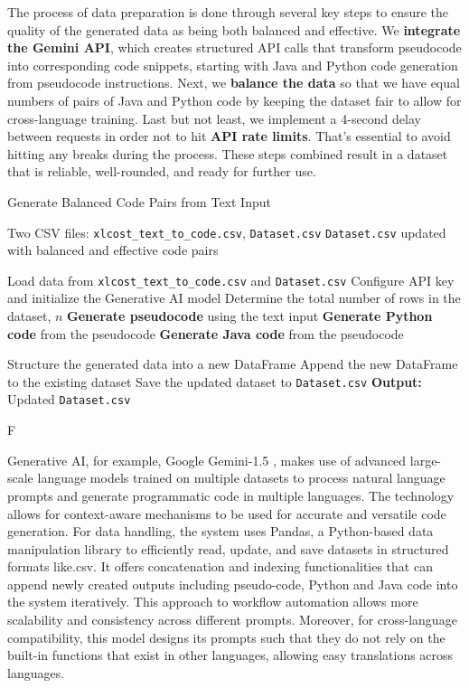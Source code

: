 \documentclass{dhbenelux}
\begin{document}
The process of data preparation is done through several key steps to ensure the quality of the generated data as being both balanced and effective. We \textbf{integrate the Gemini API}, which creates structured API calls that transform pseudocode into corresponding code snippets, starting with Java and Python code generation from pseudocode instructions. Next, we \textbf{balance the data} so that we have equal numbers of pairs of Java and Python code by keeping the dataset fair to allow for cross-language training. Last but not least, we implement a 4-second delay between requests in order not to hit \textbf{API rate limits}. That's essential to avoid hitting any breaks during the process. These steps combined result in a dataset that is reliable, well-rounded, and ready for further use.

\begin{algorithm}
\caption{Generate Balanced Code Pairs from Text Input}
\label{alg:balanced_code_pairs}
\begin{algorithmic}[1]
\Require Two CSV files: \texttt{xlcost\_text\_to\_code.csv}, \texttt{Dataset.csv}
\Ensure \texttt{Dataset.csv} updated with balanced and effective code pairs

\State Load data from \texttt{xlcost\_text\_to\_code.csv} and \texttt{Dataset.csv}
\State Configure API key and initialize the Generative AI model
\State Determine the total number of rows in the dataset, $n$
    \State \textbf{Generate pseudocode} using the text input
    \State \textbf{Generate Python code} from the pseudocode
    \State \textbf{Generate Java code} from the pseudocode
 
    \State Structure the generated data into a new DataFrame
    \State Append the new DataFrame to the existing dataset
    \State Save the updated dataset to \texttt{Dataset.csv}
\EndFor
\State \textbf{Output:} Updated \texttt{Dataset.csv}
\end{algorithmic}F
\label{alg:generate-balanced-code}
\end{algorithm}

Generative AI, for example, Google Gemini-1.5 \cite{gemini2023}, makes use of advanced large-scale language models trained on multiple datasets to process natural language prompts and generate programmatic code in multiple languages. The technology allows for context-aware mechanisms to be used for accurate and versatile code generation. For data handling, the system uses Pandas, a Python-based data manipulation library to efficiently read, update, and save datasets in structured formats like.csv. It offers concatenation and indexing functionalities that can append newly created outputs including pseudo-code, Python and Java code into the system iteratively. This approach to workflow automation allows more scalability and consistency across different prompts. Moreover, for cross-language compatibility, this model designs its prompts such that they do not rely on the built-in functions that exist in other languages, allowing easy translations across languages.
\end{document}
